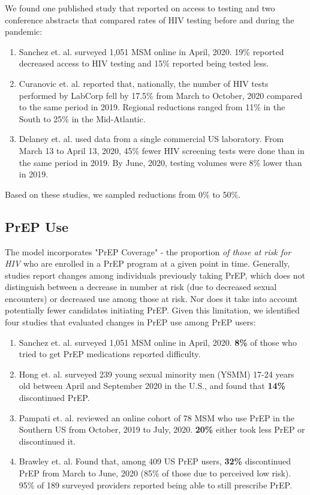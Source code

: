 \documentclass{article}
\begin{document}
We found one published study that reported on access to testing and two conference abstracts that compared rates of HIV testing before and during the pandemic:
\begin{enumerate}
	\item Sanchez et. al. \cite{sanchez2020} surveyed 1,051 MSM online in April, 2020. 19\% reported decreased access to HIV testing and 15\% reported being tested less.
	\item Curanovic et. al. \cite{curanovic2021} reported that, nationally, the number of HIV tests performed by LabCorp fell by 17.5\% from March to October, 2020 compared to the same period in 2019. Regional reductions ranged from 11\% in the South to 25\% in the Mid-Atlantic.
	\item Delaney et. al. \cite{delaney2021} used data from a single commercial US laboratory. From March 13 to April 13, 2020, 45\% fewer HIV screening tests were done than in the same period in 2019. By June, 2020, testing volumes were 8\% lower than in 2019.
\end{enumerate}

Based on these studies, we sampled reductions from 0\% to 50\%.

\subsection{PrEP Use}

The model incorporates "PrEP Coverage" - the proportion \textit{of those at risk for HIV} who are enrolled in a PrEP program at a given point in time. Generally, studies report changes among individuals previously taking PrEP, which does not distinguish between a decrease in number at risk (due to decreased sexual encounters) or decreased use among those at risk. Nor does it take into account potentially fewer candidates initiating PrEP. Given this limitation, we identified four studies that evaluated changes in PrEP use among PrEP users:

\begin{enumerate}
	\item Sanchez et. al. \cite{sanchez2020} surveyed 1,051 MSM online in April, 2020. \textbf{8\%} of those who tried to get PrEP medications reported difficulty.
	\item Hong et. al. \cite{hong2021} surveyed 239 young sexual minority men (YSMM) 17-24 years old between April and September 2020 in the U.S., and found that \textbf{14\%} discontinued PrEP.
	\item Pampati et. al. \cite{pampati2021} reviewed an online cohort of 78 MSM who use PrEP in the Southern US from October, 2019 to July, 2020. \textbf{20\%} either took less PrEP or discontinued it.
	\item Brawley et. al. \cite{brawley2020} Found that, among 409 US PrEP users, \textbf{32\%} discontinued PrEP from March to June, 2020 (85\% of those due to perceived low risk). 95\% of 189 surveyed providers reported being able to still prescribe PrEP.
\end{enumerate}
\end{document}

